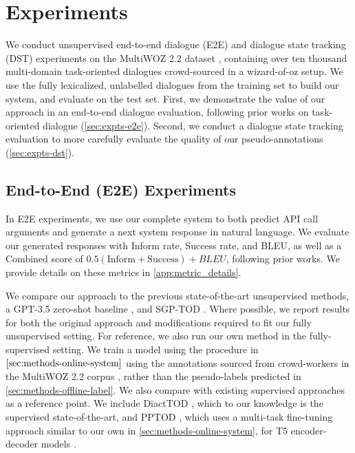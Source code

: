 \documentclass[11pt]{article}
\begin{document}
\section{Experiments}

We conduct unsupervised end-to-end dialogue (E2E) and dialogue state tracking (DST) experiments on the MultiWOZ 2.2 dataset \cite{zang_multiwoz_2020, budzianowski2018large}, containing over ten thousand multi-domain task-oriented dialogues crowd-sourced in a wizard-of-oz setup. We use the fully lexicalized, unlabelled dialogues from the training set to build our system, and evaluate on the test set.
First, we demonstrate the value of our approach in an end-to-end dialogue evaluation, following prior works on task-oriented dialogue (\autoref{sec:expts-e2e}). 
Second, we conduct a dialogue state tracking evaluation to more carefully evaluate the quality of our pseudo-annotations (\autoref{sec:expts-dst}).

\subsection{End-to-End (E2E) Experiments}
\label{sec:expts-e2e}

In E2E experiments, we use our complete system to both predict API call arguments and generate a next system response in natural language. 
We evaluate our generated responses with Inform rate, Success rate, and BLEU, as well as a Combined score of $0.5(\text{Inform} + \text{Success}) + BLEU$, following prior works. We provide details on these metrics in \autoref{app:metric_details}.

We compare our approach to the previous state-of-the-art unsupervised methods, a GPT-3.5 zero-shot baseline \cite{hudecek-dusek-2023-large}, and SGP-TOD \cite{zhang-etal-2023-sgp}. 
Where possible, we report results for both the original approach and modifications required to fit our fully unsupervised setting.
For reference, we also run our own method in the fully-supervised setting. 
We train a model using the procedure in $\autoref{sec:methods-online-system}$ using the annotations sourced from crowd-workers in the MultiWOZ 2.2 corpus \cite{budzianowski2018large, zang_multiwoz_2020}, rather than the pseudo-labels predicted in \autoref{sec:methods-offline-label}.
We also compare with existing supervised approaches as a reference point. 
We include DiactTOD \cite{wu-etal-2023-diacttod}, which to our knowledge is the supervised state-of-the-art, and PPTOD \cite{su-etal-2022-multi}, which uses a multi-task fine-tuning approach similar to our own in \autoref{sec:methods-online-system}, for T5 encoder-decoder models \cite{raffel_exploring_2020}.
\end{document}
